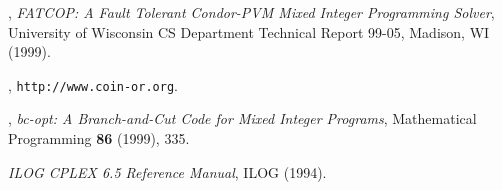 \begin{thebibliography}{9}
, {\em FATCOP: A Fault
Tolerant Condor-PVM Mixed Integer Programming Solver}, University of
Wisconsin CS Department Technical Report 99-05, Madison, WI (1999).





, {\tt http://www.coin-or.org}.

,
{\em bc-opt: A Branch-and-Cut Code for Mixed Integer Programs},
Mathematical Programming {\bf 86} (1999), 335.

{\em ILOG CPLEX 6.5 Reference Manual}, ILOG (1994).






\end{thebibliography}
